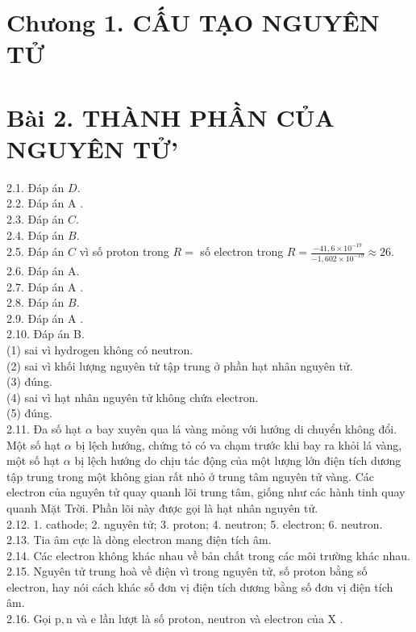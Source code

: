 \documentclass[10pt]{article}
\begin{document}
\section*{Chưong 1. CẤU TẠO NGUYÊN TỬ}
\section*{Bài 2. THÀNH PHẦN CỦA NGUYÊN TỬ'}
2.1. Đáp án $D$.\\
2.2. Đáp án A .\\
2.3. Đáp án $C$.\\
2.4. Đáp án $B$.\\
2.5. Đáp án $C$ vì số proton trong $R=$ số electron trong $R=\frac{-41,6 \times 10^{-19}}{-1,602 \times 10^{-19}} \approx 26$.\\
2.6. Đáp án A.\\
2.7. Đáp án A .\\
2.8. Đáp án $B$.\\
2.9. Đáp án A .\\
2.10. Đáp án B.\\
(1) sai vì hydrogen không có neutron.\\
(2) sai vì khối lượng nguyên tử tập trung ở phần hạt nhân nguyên tử.\\
(3) đúng.\\
(4) sai vì hạt nhân nguyên tử không chứa electron.\\
(5) đúng.\\
2.11. Đa số hạt $\alpha$ bay xuyên qua lá vàng mỏng với hướng di chuyển không đổi. Một số hạt $\alpha$ bị lệch hướng, chứng tỏ có va chạm trước khi bay ra khỏi lá vàng, một số hạt $\alpha$ bị lệch hướng do chịu tác động của một lượng lớn điện tích dương tập trung trong một không gian rất nhỏ ở trung tâm nguyên tử vàng. Các electron của nguyên tử quay quanh lõi trung tâm, giống như các hành tinh quay quanh Mặt Trời. Phần lõi này được gọi là hạt nhân nguyên tử.\\
2.12. 1. cathode; 2. nguyên tử; 3. proton; 4. neutron; 5. electron; 6. neutron.\\
2.13. Tia âm cực là dòng electron mang điện tích âm.\\
2.14. Các electron không khác nhau về bản chất trong các môi trường khác nhau.\\
2.15. Nguyên tử trung hoà về điện vì trong nguyên tử, số proton bằng số electron, hay nói cách khác số đơn vị điện tích dương bằng số đơn vị điện tích âm.\\
2.16. Gọi $\mathrm{p}, \mathrm{n}$ và e lần lượt là số proton, neutron và electron của X .
\end{document}
